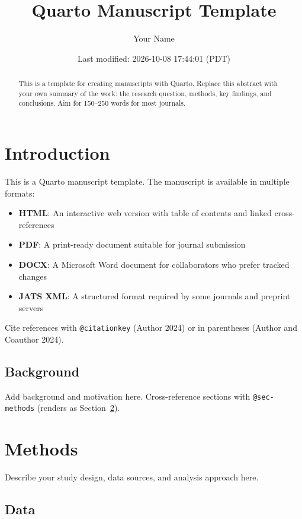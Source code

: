 \documentclass[
  letterpaper,
  DIV=11,
  numbers=noendperiod]{scrartcl}
\title{Quarto Manuscript Template}
\author{Your Name}
\date{Last modified: 2026-10-08 17:44:01 (PDT)}
\providecommand{\tightlist}{%
  \setlength{\itemsep}{0pt}\setlength{\parskip}{0pt}}
\begin{document}
\maketitle
\begin{abstract}
This is a template for creating manuscripts with Quarto. Replace this
abstract with your own summary of the work: the research question,
methods, key findings, and conclusions. Aim for 150--250 words for most
journals.
\end{abstract}


\section{Introduction}\label{sec-intro}

This is a Quarto manuscript template. The manuscript is available in
multiple formats:

\begin{itemize}
\tightlist
\item
  \textbf{HTML}: An interactive web version with table of contents and
  linked cross-references
\item
  \textbf{PDF}: A print-ready document suitable for journal submission
\item
  \textbf{DOCX}: A Microsoft Word document for collaborators who prefer
  tracked changes
\item
  \textbf{JATS XML}: A structured format required by some journals and
  preprint servers
\end{itemize}

Cite references with \texttt{@citationkey} (Author 2024) or in
parentheses (Author and Coauthor 2024).

\subsection{Background}\label{background}

Add background and motivation here. Cross-reference sections with
\texttt{@sec-methods} (renders as Section~\ref{sec-methods}).

\section{Methods}\label{sec-methods}

Describe your study design, data sources, and analysis approach here.

\subsection{Data}\label{data}
\end{document}
